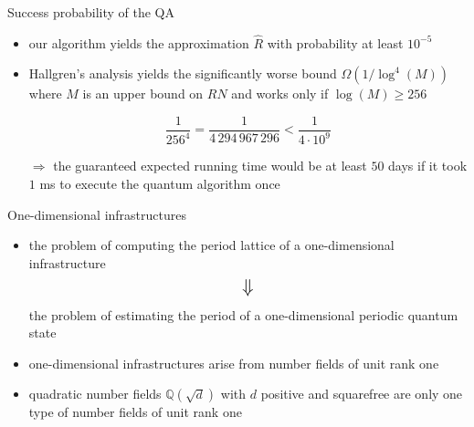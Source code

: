 \documentclass[slideColor]{prosper}
\renewcommand{\>}{\rangle}
\newcommand{\<}{\langle}
\begin{document}
\begin{slide}{Success probability of the QA}

\begin{itemize}
\item our algorithm yields the approximation $\hat{R}$ with probability at least $10^{-5}$ 

\medskip
\item Hallgren's analysis yields the significantly worse bound $\Omega(1/\log^4(M))$ where $M$ is an upper bound on $RN$ and 
works only if $\log(M) \ge 256$

\medskip
\[
\frac{1}{256^4} = \frac{1}{4\,294\,967\,296} < \frac{1}{4 \cdot 10^9}
\]

\bigskip
$\Rightarrow$ the guaranteed expected running time would be at least $50$ days if it took $1$ ms to execute the quantum algorithm once

\end{itemize}
\end{slide}


\begin{slide}{One-dimensional infrastructures}
\begin{itemize}

\medskip
\item the problem of computing the period lattice of a one-dimensional infrastructure
\[ 
\mbox{{\Large $\Downarrow$}}
\]
the problem of estimating the period of a one-dimensional periodic quantum state

\medskip
\item one-dimensional infrastructures arise from number fields of unit rank one

\medskip
\item 
quadratic number fields $\mathbb{Q}(\sqrt{d})$ with $d$ positive and squarefree are only one type of number fields of unit rank one
\end{itemize}

\end{slide}

\end{document}
